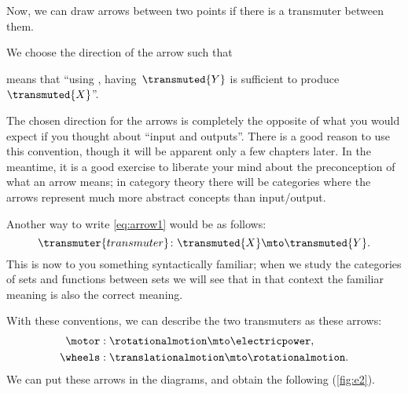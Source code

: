 Now, we can draw arrows between two points if there is a transmuter between them.

We choose the direction of the arrow such that


means that ``using , having~$\transmuted{Y}$ is sufficient to produce~$\transmuted{X}$''.

\begin{remark}
	The chosen direction for the arrows is completely the opposite of what you would expect if you thought about ``input and outputs''.
	There is a good reason to use this convention, though it will be apparent only a few chapters later.
	In the meantime, it is a good exercise to liberate your mind about the preconception of what an arrow means; in category theory there will be categories where the arrows represent much more abstract concepts than input/output.
\end{remark}

Another way to write \cref{eq:arrow1} would be as follows:
\begin{equation}
	\transmuter{transmuter} \colon \transmuted{X} \mto \transmuted{Y}.
\end{equation}
This is now to you something syntactically familiar;
when we study the categories of sets and functions between sets we will see that in that context the familiar meaning is also the correct meaning.

With these conventions, we can describe the two transmuters as these arrows:
%
\begin{equation}
	\label{eq:transmutation_example}
	\begin{aligned}
		\motor  & :  \rotationalmotion \mto \electricpower,      \\
		\wheels & : \translationalmotion \mto \rotationalmotion.
	\end{aligned}
\end{equation}
%
We can put these arrows in the diagrams, and obtain the following (\cref{fig:e2}).



